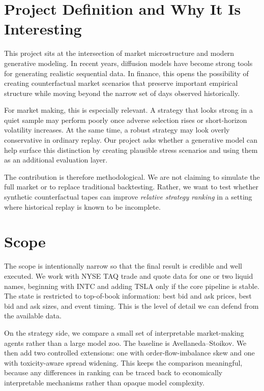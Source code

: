 \documentclass[10pt,letterpaper,twocolumn]{article}
\begin{document}
\section{Project Definition and Why It Is Interesting}

This project sits at the intersection of market microstructure and modern generative modeling. In recent years, diffusion models have become strong tools for generating realistic sequential data. In finance, this opens the possibility of creating counterfactual market scenarios that preserve important empirical structure while moving beyond the narrow set of days observed historically.

For market making, this is especially relevant. A strategy that looks strong in a quiet sample may perform poorly once adverse selection rises or short-horizon volatility increases. At the same time, a robust strategy may look overly conservative in ordinary replay. Our project asks whether a generative model can help surface this distinction by creating plausible stress scenarios and using them as an additional evaluation layer.

The contribution is therefore methodological. We are not claiming to simulate the full market or to replace traditional backtesting. Rather, we want to test whether synthetic counterfactual tapes can improve \emph{relative strategy ranking} in a setting where historical replay is known to be incomplete.

\section{Scope}

The scope is intentionally narrow so that the final result is credible and well executed. We work with NYSE TAQ trade and quote data for one or two liquid names, beginning with INTC and adding TSLA only if the core pipeline is stable. The state is restricted to top-of-book information: best bid and ask prices, best bid and ask sizes, and event timing. This is the level of detail we can defend from the available data.

On the strategy side, we compare a small set of interpretable market-making agents rather than a large model zoo. The baseline is Avellaneda--Stoikov. We then add two controlled extensions: one with order-flow-imbalance skew and one with toxicity-aware spread widening. This keeps the comparison meaningful, because any differences in ranking can be traced back to economically interpretable mechanisms rather than opaque model complexity.
\end{document}

